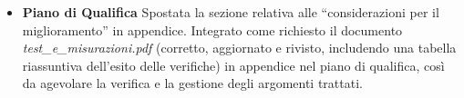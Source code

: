 \begin{itemize}
\item \textbf{Piano di Qualifica} Spostata la sezione relativa alle ``considerazioni per il miglioramento'' in appendice. Integrato come richiesto il documento \textit{test\_e\_misurazioni.pdf} (corretto, aggiornato e rivisto, includendo una tabella riassuntiva dell'esito delle verifiche) in appendice nel piano di qualifica, così da agevolare la verifica e la gestione degli argomenti trattati.
\end{itemize}


